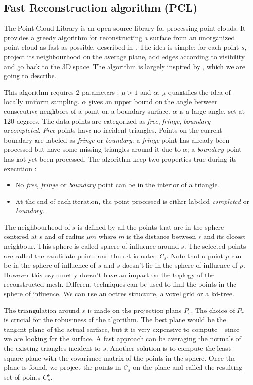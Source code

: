 \documentclass[12pt]{article}
\begin{document}
\subsection{Fast Reconstruction algorithm (PCL)}
The Point Cloud Library is an open-source library for processing point clouds. It provides a greedy algorithm for reconstructing a surface from an unorganized point cloud as fast as possible, described in \cite{PCL1}. The idea is simple: for each point $s$, project its neighbourhood on the average plane, add edges according to visibility and go back to the 3D space. The algorithm is largely inspired by \cite{PCL2}, which we are going to describe.

This algorithm requires 2 parameters : $\mu > 1$ and $\alpha$. $\mu$ quantifies the idea of locally uniform sampling. $\alpha$ gives an upper bound on the angle between consecutive neighbors of a point on a boundary surface. $\alpha$ is a large angle, set at 120 degrees. The data points are categorized as \textit{free}, \textit{fringe}, \textit{boundary} or\textit{completed}. \textit{Free} points have no incident triangles. Points on the current boundary are labeled as \textit{fringe} or \textit{boundary}: a \textit{fringe} point has already been processed but have some missing triangles around it due to $\alpha$; a \textit{boundary} point has not yet been processed. The algorithm keep two properties true during its execution :
\begin{itemize}
\item No \textit{free}, \textit{fringe} or \textit{boundary} point can be in the interior of a triangle.
\item At the end of each iteration, the point processed is either labeled \textit{completed} or \textit{boundary}.
\end{itemize}

The neighbourhood of $s$ is defined by all the points that are in the sphere centered at $s$ and of radius $\mu m$ where $m$ is the distance between $s$ and its closest neighbour. This sphere is called sphere of influence around $s$. The selected points are called the candidate points and the set is noted $C_s$. Note that a point $p$ can be in the sphere of influence of $s$ and $s$ doesn't lie in the sphere of influence of $p$. However this asymmetry doesn't have an impact on the toplogy of the reconstructed mesh. Different techniques can be used to find the points in the sphere of influence. We can use an octree structure, a voxel grid or a kd-tree.

The triangulation around $s$ is made on the projection plane $P_s$. The choice of $P_r$ is crucial for the robustness of the algorithm. The best plane would be the tangent plane of the actual surface, but it is very expensive to compute -- since we are looking for the surface. A fast approach can be averaging the normals of the existing triangles incident to $s$. Another solution is to compute the least square plane with the covariance matrix of the points in the sphere. Once the plane is found, we project the points in $C_s$ on the plane and called the resulting set of points $C^p_s$.
\end{document}
